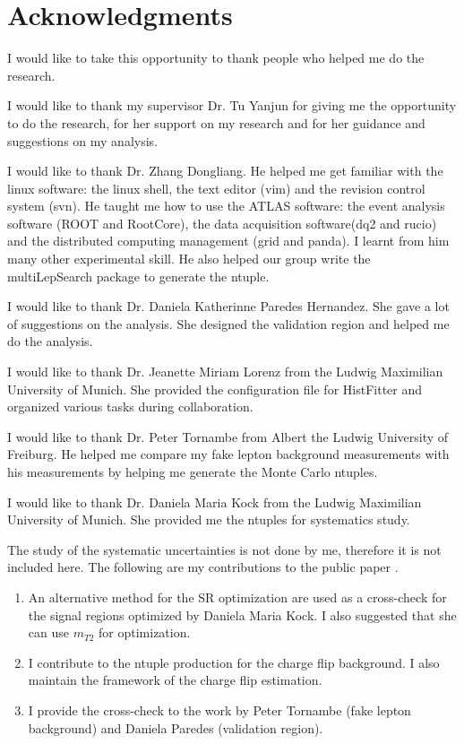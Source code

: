 
\chapter*{Acknowledgments}

I would like to take this opportunity to thank people who helped me do the research.

I would like to thank my supervisor Dr. Tu Yanjun for giving me the opportunity to do the research, for her support on my research and for her guidance and suggestions on my analysis.

I would like to thank Dr. Zhang Dongliang.
He helped me get familiar with the linux software: the linux shell, the text editor (vim) and the revision control system (svn).
He taught me how to use the ATLAS software: the event analysis software (ROOT and RootCore), the data acquisition software(dq2 and rucio) and the distributed computing management (grid and panda).
I learnt from him many other experimental skill.
He also helped our group write the multiLepSearch package to generate the ntuple.

I would like to thank Dr. Daniela Katherinne Paredes Hernandez.
She gave a lot of suggestions on the analysis.
She designed the validation region and helped me do the analysis.

I would like to thank Dr. Jeanette Miriam Lorenz from the Ludwig Maximilian University of Munich.
She provided the configuration file for HistFitter and organized various tasks during collaboration.

I would like to thank Dr. Peter Tornambe from Albert the Ludwig University of Freiburg.
He helped me compare my fake lepton background measurements with his measurements by helping me generate the Monte Carlo ntuples.

I would like to thank Dr. Daniela Maria Kock from the Ludwig Maximilian University of Munich.
She provided me the ntuples for systematics study.

The study of the systematic uncertainties is not done by me, therefore it is not included here.
The following are my contributions to the public paper \cite{Wh} \cite{WhSS}.
\begin{enumerate}
\item An alternative method for the SR optimization are used as a cross-check for the signal regions optimized by Daniela Maria Kock. I also suggested that she can use $m_{T2}$ for optimization.
\item I contribute to the ntuple production for the charge flip background. I also maintain the framework of the charge flip estimation.
\item I provide the cross-check to the work by Peter Tornambe (fake lepton background) and Daniela Paredes (validation region).
\end{enumerate}
